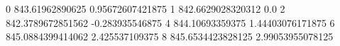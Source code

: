 0 843.61962890625 0.95672607421875
1 842.6629028320312 0.0
2 842.3789672851562 -0.283935546875
4 844.10693359375 1.44403076171875
6 845.0884399414062 2.425537109375
8 845.6534423828125 2.99053955078125

